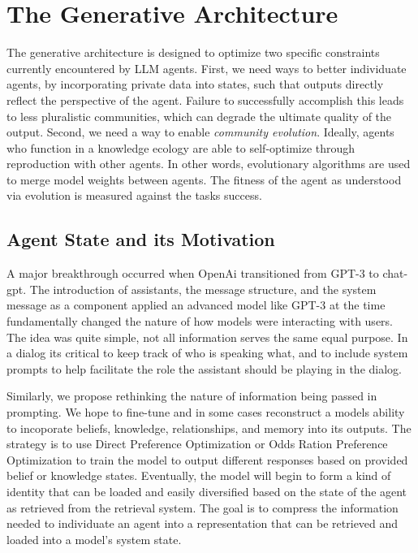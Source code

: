 \section{The Generative Architecture}
The generative architecture is designed to optimize two specific constraints currently encountered by LLM agents. First, we need ways to better individuate agents, by incorporating private data into states, such that outputs directly reflect the perspective of the agent. Failure to successfully accomplish this leads to less pluralistic communities, which can degrade the ultimate quality of the output. Second, we need a way to enable \textit{community evolution}. Ideally, agents who function in a knowledge ecology are able to self-optimize through reproduction with other agents. In other words, evolutionary algorithms are used to merge model weights between agents. The fitness of the agent as understood via evolution is measured against the tasks success.

\subsection{Agent State and its Motivation}

A major breakthrough occurred when OpenAi transitioned from GPT-3 to chat-gpt. The introduction of assistants, the message structure, and the system message as a component applied an advanced model like GPT-3 at the time fundamentally changed the nature of how models were interacting with users. The idea was quite simple, not all information serves the same equal purpose. In a dialog its critical to keep track of who is speaking what, and to include system prompts to help facilitate the role the assistant should be playing in the dialog.

Similarly, we propose rethinking the nature of information being passed in prompting. We hope to fine-tune and in some cases reconstruct a models ability to incoporate beliefs, knowledge, relationships, and memory into its outputs. The strategy is to use Direct Preference Optimization or Odds Ration Preference Optimization to train the model to output different responses based on provided belief or knowledge states. Eventually, the model will begin to form a kind of identity that can be loaded and easily diversified based on the state of the agent as retrieved from the retrieval system. The goal is to compress the information needed to individuate an agent into a representation that can be retrieved and loaded into a model's system state.

